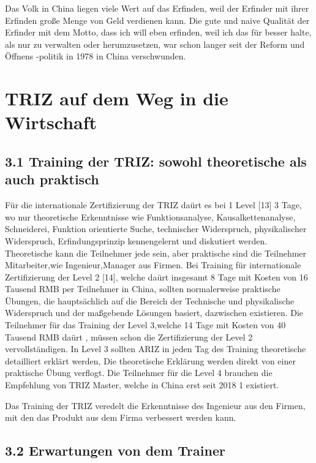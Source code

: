 \documentclass[11pt,a4paper]{article}
\begin{document}
Das Volk in China liegen viele Wert auf das Erfinden, weil der Erfinder mit
ihrer Erfinden große Menge von Geld verdienen kann. Die gute und naive
Qualität der Erfinder mit dem Motto, dass ich will eben erfinden, weil ich das
für besser halte, als nur zu verwalten oder herumzusetzen, war schon langer
seit der Reform und Öffnens -politik in 1978 in China verschwunden.

\section{TRIZ auf dem Weg in die Wirtschaft}

\subsection{3.1   Training der TRIZ: sowohl theoretische als auch praktisch}

Für die internationale Zertifizierung der TRIZ daürt es bei 1 Level [13] 3
Tage, wo nur theoretische Erkenntnisse wie Funktionsanalyse,
Kausalkettenanalyse, Schneiderei, Funktion orientierte Suche, technischer
Widerspruch, physikalischer Widerspruch, Erfindungsprinzip kennengelernt und
diskutiert werden. Theoretische kann die Teilnehmer jede sein, aber praktische
sind die Teilnehmer Mitarbeiter,wie Ingenieur,Manager aus Firmen. Bei Training
für internationale Zertifizierung der Level 2 [14], welche daürt insgesamt 8
Tage mit Kosten von 16 Tausend RMB per Teilnehmer in China, sollten
normalerweise praktische Übungen, die hauptsächlich auf die Bereich der
Technische und physikalische Widerspruch und der maßgebende Lösungen basiert,
dazwischen existieren. Die Teilnehmer für das Training der Level 3,welche 14
Tage mit Kosten von 40 Tausend RMB daürt , müssen schon die Zertifizierung
der Level 2 vervollständigen. In Level 3 sollten ARIZ in jeden Tag des
Training theoretische detailliert erklärt werden, Die theoretische Erklärung
werden direkt von einer praktische Übung verflogt. Die Teilnehmer für die
Level 4 brauchen die Empfehlung von TRIZ Master, welche in China erst seit
2018 1 existiert.

Das Training der TRIZ veredelt die Erkenntnisse des Ingenieur aus den Firmen,
mit den das Produkt aus dem Firma verbessert werden kann.
  
\subsection{3.2 Erwartungen von dem Trainer}
\end{document}
